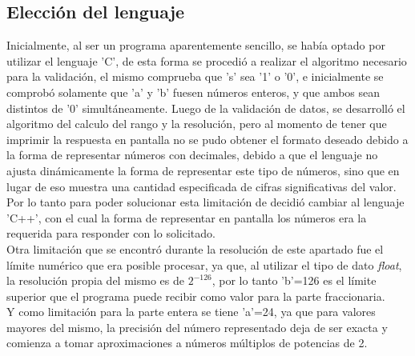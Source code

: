 \subsection{Elecci\'on del lenguaje}
\noindent
Inicialmente, al ser un programa aparentemente sencillo, se hab\'ia optado por utilizar el lenguaje 'C', de esta forma se procedi\'o a realizar el algoritmo necesario para la validaci\'on, el mismo comprueba que 's' sea '1' o '0', e inicialmente se comprob\'o solamente que 'a' y 'b' fuesen n\'umeros enteros, y que ambos sean distintos de '0' simultáneamente. Luego de la validaci\'on de datos, se desarroll\'o el algoritmo del calculo del rango y la resoluci\'on, pero al momento de tener que imprimir la respuesta en pantalla no se pudo obtener el formato deseado debido a la forma de representar n\'umeros con decimales, debido a que el lenguaje no ajusta din\'amicamente la forma de representar este tipo de números, sino que en lugar de eso muestra una cantidad especificada de cifras significativas del valor.\\
Por lo tanto para poder solucionar esta limitaci\'on de decidi\'o cambiar al lenguaje 'C++', con el cual la forma de representar en pantalla los n\'umeros era la requerida para responder con lo solicitado.\\
Otra limitaci\'on que se encontró durante la resolución de este apartado fue el l\'imite num\'erico que era posible procesar, ya que, al utilizar el tipo de dato \textit{float}, la resoluci\'on propia del mismo es de $2^{-126}$, por lo tanto 'b'=126 es el l\'imite superior que el programa puede recibir como valor para la parte fraccionaria.\\
Y como limitación para la parte entera se tiene 'a'=24, ya que para valores mayores del mismo, la precisión del n\'umero representado deja de ser exacta y comienza a tomar aproximaciones a n\'umeros múltiplos de potencias de 2.\\ 